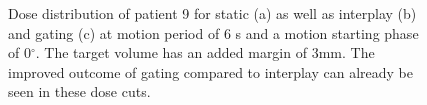 \documentclass[type=dr, dr=rernat, accentcolor=tud7b,colorbacktitle, bigchapter, openright, twoside, 12pt ]{tudthesis}
\begin{document}
 \begin{figure}[H]
 \begin{center}
\caption{Dose distribution of patient 9 for static (a) as well as interplay (b) and gating (c) at motion period of 6 s and a motion starting 
phase of 0$^{\circ}$. The target volume has an added margin of 3mm. The improved outcome of gating compared to interplay 
can already be seen in these dose cuts.}
\label{dose_pat122}
 \end{center}
\end{figure}
\end{document}
